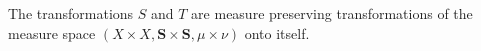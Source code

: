 The transformations $S$ and $T$ are measure preserving transformations of the measure space $(X \times X, \mathbf{S} \times \mathbf{S}, \mu \times \nu)$ onto itself.

